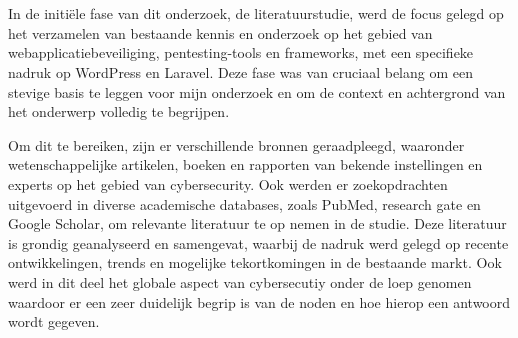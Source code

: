 
\chapter{}%
\label{ch:methodologie}


In de initiële fase van dit onderzoek, de literatuurstudie, werd de focus gelegd op het verzamelen van bestaande kennis 
en onderzoek op het gebied van webapplicatiebeveiliging, pentesting-tools en frameworks, met een specifieke nadruk op 
WordPress en Laravel. Deze fase was van cruciaal 
belang om een stevige basis te leggen voor mijn onderzoek en om de context en achtergrond van het onderwerp volledig te 
begrijpen.

Om dit te bereiken, zijn er verschillende bronnen geraadpleegd, waaronder wetenschappelijke artikelen, boeken  
en rapporten van bekende instellingen en experts op het gebied van cybersecurity. 
Ook werden er zoekopdrachten uitgevoerd in diverse academische databases, zoals PubMed, research gate en 
Google Scholar, om relevante literatuur te op nemen in de studie. Deze literatuur is grondig geanalyseerd en 
samengevat, waarbij de nadruk werd gelegd op recente ontwikkelingen, trends en mogelijke tekortkomingen in de bestaande markt.
Ook werd in dit deel het globale aspect van cybersecutiy onder de loep genomen waardoor er een zeer duidelijk begrip 
is van de noden en hoe hierop een antwoord wordt gegeven.

